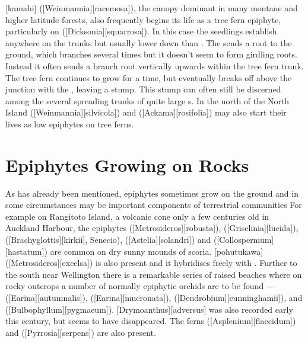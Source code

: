 [kamahi] ([Weinmannia][racemosa]), the canopy dominant in many montane and higher latitude forests, also frequently begins its life as a tree fern epiphyte, particularly on  ([Dicksonia][squarrosa]).
In this case the seedlings establish anywhere on the trunks but usually lower down than .
The  sends a root to the ground, which branches several times but it doesn't seem to form girdling roots.
Instead it often sends a branch root vertically upwards within the tree fern trunk.
The tree fern continues to grow for a time, but eventually breaks off above the junction with the , leaving a stump.
This stump can often still be discerned among the several spreading trunks of quite large s.
In the north of the North Island  ([Weinmannia][silvicola]) and  ([Ackama][rosifolia]) may also start their lives as low epiphytes on tree ferns.

\section{Epiphytes Growing on Rocks}

As has already been mentioned, epiphytes sometimes grow on the ground and in some circumstances may be important components of terrestrial communities For example on Rangitoto Island, a volcanic cone only a few centuries old in Auckland Harbour, the epiphytes  ([Metrosideros][robusta]),  ([Griselinia][lucida]),  ([Brachyglottis][kirkii], Senecio),  ([Astelia][solandri]) and  ([Collospermum][hastatum]) are common on dry sunny mounds of scoria.
[pohutukawa] ([Metrosideros][excelsa]) is also present and it hybridises freely with .
Further to the south near Wellington there is a remarkable series of raised beaches where on rocky outcrops a number of normally epiphytic orchids are to be found ---  ([Earina][autumnalis]),  ([Earina][mucronata]),  ([Dendrobium][cunninghamii]), and  ([Bulbophyllum][pygmaeum]).
[Drymoanthus][adversus] was also recorded early this century, but seems to have disappeared.
The ferns  ([Asplenium][flaccidum]) and  ([Pyrrosia][serpens]) are also present.

